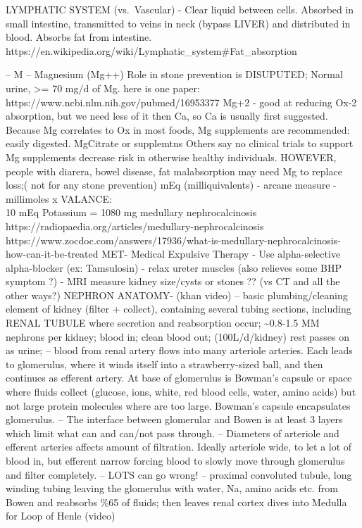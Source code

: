 LYMPHATIC SYSTEM (vs.~Vascular) - Clear liquid between cells. Absorbed
in small intestine, transmitted to veins in neck (bypass LIVER) and
distributed in blood. Absorbs fat from intestine.
https://en.wikipedia.org/wiki/Lymphatic\_system\#Fat\_absorption

-- M -- Magnesium (Mg++) Role in stone prevention is DISUPUTED; Normal
urine, \textgreater= 70 mg/d of Mg. here is one paper:
https://www.ncbi.nlm.nih.gov/pubmed/16953377 Mg+2 - good at reducing
Ox-2 absorption, but we need less of it then Ca, so Ca is usually first
suggested. Because Mg correlates to Ox in most foods, Mg supplements are
recommended: easily digested. MgCitrate or supplemtns Others say no
clinical trials to support Mg supplements decrease risk in otherwise
healthy individuals. HOWEVER, people with diarera, bowel disease, fat
malabsorption may need Mg to replace loss;( not for any stone
prevention) mEq (milliquivalents) - arcane measure - millimoles x
VALANCE:\\
10 mEq Potassium = 1080 mg medullary nephrocalcinosis
https://radiopaedia.org/articles/medullary-nephrocalcinosis
https://www.zocdoc.com/answers/17936/what-is-medullary-nephrocalcinosis-how-can-it-be-treated
MET- Medical Expulsive Therapy - Use alpha-selective \textbar{}
alpha-blocker (ex: Tamsulosin) - relax ureter muscles (also relieves
some BHP symptom ?) - MRI measure kidney size/cysts or stones ?? (vs CT
and all the other ways?) NEPHRON ANATOMY- (khan video) -- basic
plumbing/cleaning element of kidney (filter + collect), containing
several tubing sections, including RENAL TUBULE where secretion and
reabsorption occur; \textasciitilde0.8-1.5 MM nephrons per kidney; blood
in; clean blood out; (100L/d/kidney) rest passes on as urine; -- blood
from renal artery flows into many arteriole arteries. Each leads to
glomerulus, where it winds itself into a strawberry-sized ball, and then
continues as efferent artery. At base of glomerulus is Bowman's capsule
or space where fluids collect (glucose, ions, white, red blood cells,
water, amino acids) but not large protein molecules where are too large.
Bowman's capsule encapsulates glomerulus. -- The interface between
glomerular and Bowen is at least 3 layers which limit what can and
can/not pass through. -- Diameters of arteriole and efferent arteries
affects amount of filtration. Ideally arteriole wide, to let a lot of
blood in, but efferent narrow forcing blood to slowly move through
glomerulus and filter completely. -- LOTS can go wrong! -- proximal
convoluted tubule, long winding tubing leaving the glomerulus with
water, Na, amino acids etc. from Bowen and reabsorbs \%65 of fluids;
then leaves renal cortex dives into Medulla for Loop of Henle (video)


